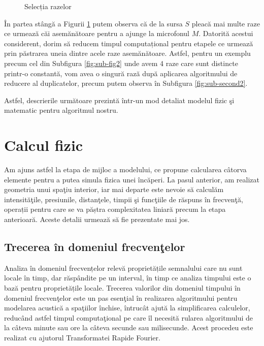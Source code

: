 \begin{figure}[!htb]
		\caption{Selecția razelor}
		\label{reduction}
	\end{figure}
	
	În partea stângă a Figurii \ref{reduction} putem observa că de la sursa $S$ pleacă mai multe raze ce urmează căi asemănătoare pentru a ajunge la microfonul $M$. Datorită acestui considerent, dorim să reducem timpul computațional pentru etapele ce urmează prin păstrarea uneia dintre acele raze asemănătoare. Astfel, pentru un exemplu precum cel din Subfigura \ref{fig:sub-fig2} unde avem 4 raze care sunt distincte printr-o constantă, vom avea o singură rază după aplicarea algoritmului de reducere al duplicatelor, precum putem observa în Subfigura \ref{fig:sub-second2}.
	
	Astfel, descrierile urm\u{a}toare prezint\u{a} \^{i}ntr-un mod detaliat modelul fizic \c{s}i matematic pentru algoritmul nostru.

\section{Calcul fizic}

	Am ajuns astfel la etapa de mijloc a modelului, ce propune calcularea c\^{a}torva elemente pentru a putea simula fizica unei \^{i}nc\u{a}peri. La pasul anterior, am realizat geometria unui spa\c{t}iu interior, iar mai departe este nevoie s\u{a} calcul\u{a}m intensit\u{a}\c{t}ile, presiunile, distan\c{t}ele, timpii \c{s}i func\c{t}iile de r\u{a}spuns \^{i}n frecven\c{t}\u{a}, operații pentru care se va păștra complexitatea liniară precum la etapa anterioară. Aceste detalii urmeaz\u{a} s\u{a} fie prezentate mai jos.
	
\subsection{Trecerea \^{i}n domeniul frecven\c{t}elor}
	
	Analiza în domeniul frecvențelor relevă proprietățile semnalului care nu sunt locale în timp, dar răspândite pe un interval, în timp ce analiza timpului este o bază pentru proprietățile locale. Trecerea valorilor din domeniul timpului \^{i}n domeniul frecven\c{t}elor este un pas esen\c{t}ial \^{i}n realizarea algoritmului pentru modelarea acustic\u{a} a spa\c{t}iilor \^{i}nchise, \^{i}ntruc\^{a}t ajut\u{a} la simplificarea calculelor, reduc\^{a}nd astfel timpul computa\c{t}ional pe care \^{i}l necesit\u{a} rularea algoritmului de la câteva minute sau ore la câteva secunde sau milisecunde. Acest procedeu este realizat cu ajutorul Transformatei Rapide Fourier.
	
